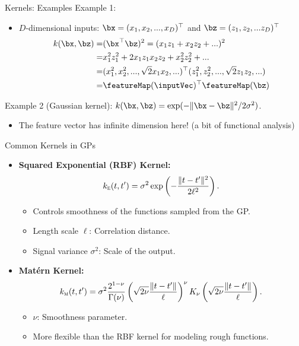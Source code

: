 \documentclass[11pt,handout,aspectratio=169]{beamer}
\begin{document}
\begin{frame}{Kernels: Examples}
Example 1:  \\[-.1cm]
\begin{itemize}
  \item $D$-dimensional inputs: $\bx=(x_1,x_2,...,x_D)^\top$ and $\bz =(z_1,z_2,...z_D)^\top$
  \begin{align*}
  k(\bx,\bz) =& (\bx^\top\bz)^2 = (x_1z_1 + x_2z_2 + ...)^2\\
  =& x_1^2z_1^2 +2x_1 z_1x_2z_2  + x_2^2z_2^2 + ...\\
  =& (x_1^2, x_2^2,...,\sqrt{2}x_1x_2, ...)^\top(z_1^2, z_2^2,...,\sqrt{2}z_1z_2,...)\\
  =&\featureMap(\inputVec)^\top\featureMap(\bz)
  \end{align*}
\end{itemize}
\vspace{.3cm}
Example 2 (Gaussian kernel):
  $ k(\bx,\bz) =\exp(- \|\bx-\bz\|^2/2\sigma^2)$.\\[.1cm]  
  \begin{itemize}
  	\item The feature vector has infinite dimension here! (a bit of functional analysis)
  \end{itemize}
\end{frame}




\begin{frame}{Common Kernels in GPs}
\begin{itemize}
    \item \textbf{Squared Exponential (RBF) Kernel:}
    \[
    k_{\textsc{e}}(t, t') = \sigma^2 \exp\left(-\frac{\|t - t'\|^2}{2\ell^2}\right).
    \]
    \begin{itemize}
        \item Controls smoothness of the functions sampled from the GP.
        \item Length scale \( \ell \): Correlation distance.
        \item Signal variance \( \sigma^2 \): Scale of the output.
    \end{itemize}
    \item \textbf{Mat\'{e}rn Kernel:}
    \[
    k_{\textsc{m}}(t, t') = \sigma^2 \frac{2^{1-\nu}}{\Gamma(\nu)} \left(\sqrt{2\nu} \frac{\|t - t'\|}{\ell}\right)^\nu K_\nu\left(\sqrt{2\nu} \frac{\|t - t'\|}{\ell}\right).
    \]
    \begin{itemize}
        \item \( \nu \): Smoothness parameter.
        \item More flexible than the RBF kernel for modeling rough functions.
    \end{itemize}
\end{itemize}
\end{frame}
\end{document}
